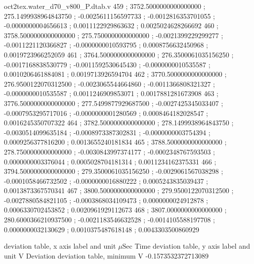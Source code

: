 \begin{filecontents}[overwrite]{oct2tex.water_d70_v800_P.dtab.v}
459 ; 3752.5000000000000000 ; 275.1499938964843750 ; -0.0025611156597733 ; -0.0012816353701055 ; -0.0000000004656613 ; 0.0011122929863632 ; 0.0025024628266692
460 ; 3758.5000000000000000 ; 275.7500000000000000 ; -0.0021399229299277 ; -0.0011221120366827 ; -0.0000000010593795 ; 0.0008756632450968 ; 0.0019723966252059
461 ; 3764.5000000000000000 ; 276.3500061035156250 ; -0.0017168838530779 ; -0.0011592530645430 ; -0.0000000010535587 ; 0.0010206461884081 ; 0.0019713926594704
462 ; 3770.5000000000000000 ; 276.9500122070312500 ; -0.0023065544664860 ; -0.0011366808321327 ; -0.0000000010535587 ; 0.0011246909853071 ; 0.0017881281673908
463 ; 3776.5000000000000000 ; 277.5499877929687500 ; -0.0027425345033407 ; -0.0007953295717016 ; -0.0000000001280569 ; 0.0008464182028547 ; 0.0016245350707322
464 ; 3782.5000000000000000 ; 278.1499938964843750 ; -0.0030514099635184 ; -0.0008973387302831 ; -0.0000000003754394 ; 0.0009256377816200 ; 0.0013655240181834
465 ; 3788.5000000000000000 ; 278.7500000000000000 ; -0.0030843997374177 ; -0.0002348767593503 ; 0.0000000003376044 ; 0.0005028704181314 ; 0.0011234162375331
466 ; 3794.5000000000000000 ; 279.3500061035156250 ; -0.0029061567038298 ; -0.0001058466732502 ; -0.0000000016880222 ; 0.0005243835039437 ; 0.0013873367570341
467 ; 3800.5000000000000000 ; 279.9500122070312500 ; -0.0027880584821105 ; -0.0003868034109473 ; 0.0000000024912878 ; 0.0006330702453852 ; 0.0020961929112673
468 ; 3807.0000000000000000 ; 280.6000366210937500 ; -0.0021183546632528 ; -0.0014105588197708 ; 0.0000000032130629 ; 0.0010375487618148 ; 0.0043303500860929
\end{filecontents}
\expandafter\def\csname oct2tex.water_d70_v800_P.dtabxlbl.d\endcsname{deviation table, x axis label and unit}
\expandafter\def\csname oct2tex.water_d70_v800_P.dtabxlbl.u\endcsname{\ensuremath{\mu\text{Sec}}}
\expandafter\def\csname oct2tex.water_d70_v800_P.dtabxlbl.v\endcsname{Time}
\expandafter\def\csname oct2tex.water_d70_v800_P.dtabylbl.d\endcsname{deviation table, y axis label and unit}
\expandafter\def\csname oct2tex.water_d70_v800_P.dtabylbl.u\endcsname{\ensuremath{\text{V}}}
\expandafter\def\csname oct2tex.water_d70_v800_P.dtabylbl.v\endcsname{Deviation}
\expandafter\def\csname oct2tex.water_d70_v800_P.dtabmin.d\endcsname{deviation table, minimum}
\expandafter\def\csname oct2tex.water_d70_v800_P.dtabmin.u\endcsname{\ensuremath{\text{V}}}
\expandafter\def\csname oct2tex.water_d70_v800_P.dtabmin.v\endcsname{-0.1573532372713089}
